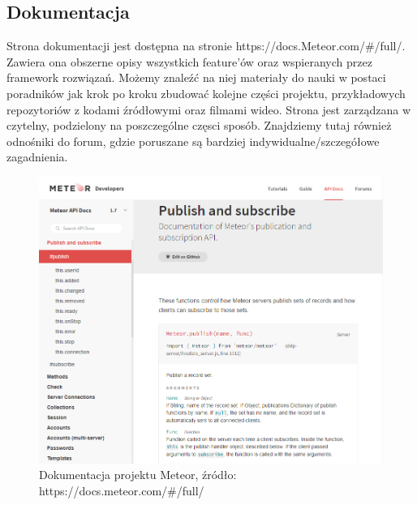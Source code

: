 \documentclass[12pt]{report}
\begin{document}
    \subsection{Dokumentacja}
      Strona dokumentacji jest dostępna na stronie https://docs.Meteor.com/\#/full/.
      Zawiera ona obszerne opisy wszystkich feature'ów oraz wspieranych przez framework rozwiązań.
      Możemy znaleźć na niej materiały do nauki w postaci poradników jak krok po kroku zbudować kolejne części projektu, przykładowych repozytoriów z kodami źródłowymi oraz filmami wideo.
      Strona jest zarządzana w czytelny, podzielony na poszczególne częsci sposób.
      Znajdziemy tutaj również odnośniki do forum, gdzie poruszane są bardziej indywidualne/szczegółowe zagadnienia.
      \begin{figure}[!hb]
        \centering
        \includegraphics[width=\textwidth,height=\textheight,keepaspectratio]{doc_meteor.png} 
        \caption{Dokumentacja projektu Meteor, źródło: https://docs.meteor.com/\#/full/}
      \end{figure}
\end{document}
